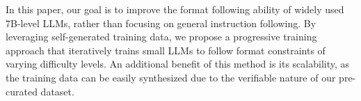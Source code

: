 In this paper, our goal is to improve the format following ability of widely used 7B-level LLMs, rather than focusing on general instruction following. 
By leveraging self-generated training data, we propose a progressive training approach that iteratively trains small LLMs to follow format constraints of varying difficulty levels. 
An additional benefit of this method is its scalability, as the training data can be easily synthesized due to the verifiable nature of our pre-curated \dataset dataset.